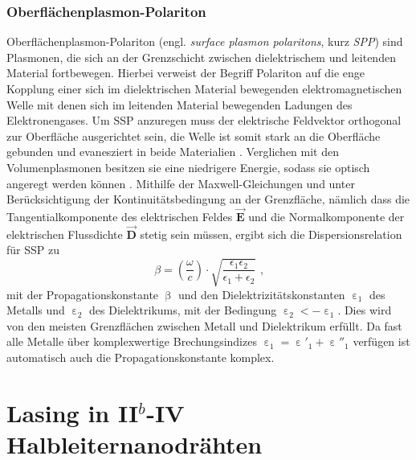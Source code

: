 \subsubsection{Oberflächenplasmon-Polariton}
Oberflächenplasmon-Polariton (engl. \textit{surface plasmon polaritons}, kurz \textit{SPP}) sind Plasmonen, die sich an der Grenzschicht zwischen dielektrischem und leitenden Material fortbewegen. Hierbei verweist der Begriff Polariton auf die enge Kopplung einer sich im dielektrischen Material bewegenden elektromagnetischen Welle mit denen sich im leitenden Material bewegenden Ladungen des Elektronengases. Um SSP anzuregen muss der elektrische Feldvektor orthogonal zur Oberfläche ausgerichtet sein, die Welle ist somit stark an die Oberfläche gebunden und evanesziert in beide Materialien \cite{Roeder.Diss}.
Verglichen mit den Volumenplasmonen besitzen sie eine niedrigere Energie, sodass sie optisch angeregt werden können \cite{Maier.2010}.
Mithilfe der Maxwell-Gleichungen und unter Berücksichtigung der Kontinuitätsbedingung an der Grenzfläche, nämlich dass die Tangentialkomponente des elektrischen Feldes $\vec{\textbf{E}}$ und die Normalkomponente der elektrischen Flussdichte $\vec{\textbf{D}}$ stetig sein müssen, ergibt sich die Dispersionsrelation für SSP zu
\begin{equation}
\beta=\left(\frac{\omega}{c}\right)\cdot \sqrt{\frac{\epsilon_1\epsilon_2}{\epsilon_1+\epsilon_2}} \text{ ,}
\end{equation}
mit der Propagationskonstante $\upbeta$ und den Dielektrizitätskonstanten $\upepsilon_\text{1}$ des Metalls und $\upepsilon_\text{2}$ des Dielektrikums, mit der Bedingung $\upepsilon_\text{2}<-\upepsilon_\text{1}$. Dies wird von den meisten Grenzflächen zwischen Metall und Dielektrikum erfüllt. Da fast alle Metalle über komplexwertige Brechungsindizes $\upepsilon_\text{1}=\upepsilon'_\text{1}+\upepsilon''_\text{1}$ verfügen ist automatisch auch die Propagationskonstante komplex.
\section{Lasing in II$^b$-IV Halbleiternanodrähten}
